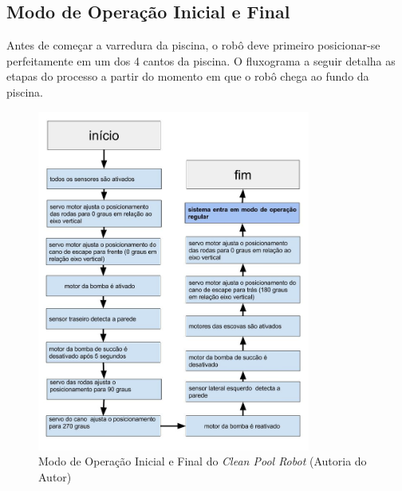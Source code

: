 \subsection{Modo de Operação Inicial e Final}
Antes de começar a varredura da piscina, o robô deve primeiro posicionar-se
perfeitamente em um dos 4 cantos da piscina. O fluxograma a seguir detalha
as etapas do processo a partir do momento em que o robô chega ao fundo
da piscina.
\par
\begin{figure}[h]
  \centering
  \includegraphics[width=0.8\textwidth]{figures/flow-initial-robot.jpg}
  \caption{Modo de Operação Inicial e Final do \textit{Clean Pool Robot} (\textsf{Autoria do Autor})}
  \label{fig:flow-initial-robot}
\end{figure}
\FloatBarrier

